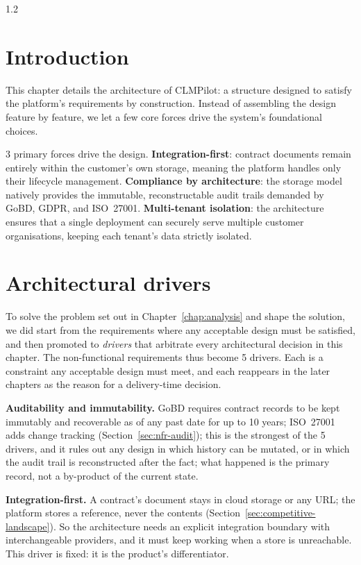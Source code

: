\begin{spacing}{1.2}

\section*{Introduction}
This chapter details the architecture of CLMPilot: a structure designed
to satisfy the platform's requirements by construction. Instead of assembling the design feature by feature, we let a few
core forces drive the system's foundational choices.

3 primary forces drive the design. \textbf{Integration-first}: contract
documents remain entirely within the customer’s own storage, meaning the platform 
handles only their lifecycle management.
\textbf{Compliance by architecture}: the storage model natively provides the immutable,
reconstructable audit trails demanded by GoBD, GDPR, and ISO~27001.
\textbf{Multi-tenant isolation}: the architecture ensures that a single deployment
can securely serve multiple customer organisations, keeping each tenant's data
strictly isolated.

\section{Architectural drivers}
\label{sec:arch-drivers}

To solve the problem set out in Chapter~\ref{chap:analysis} and shape the
solution, we did start from the requirements where
any acceptable design must be satisfied, and then promoted to \emph{drivers}
that arbitrate every architectural decision in this chapter. The
non-functional requirements thus become 5 drivers. Each is a
constraint any acceptable design must meet, and each reappears in the later
chapters as the reason for a delivery-time decision.

\textbf{Auditability and immutability.} GoBD requires contract records to be
kept immutably and recoverable as of any past date for up to 10 years;
ISO~27001 adds change tracking (Section~\ref{sec:nfr-audit}); this is the
strongest of the 5 drivers, and it rules out any design in which history can be mutated,
or in which the audit trail is reconstructed after the fact; what happened
is the primary record, not a by-product of the current state.

\textbf{Integration-first.} A contract's document stays in cloud storage or any URL; 
the platform stores a reference, never the contents
(Section~\ref{sec:competitive-landscape}). So the architecture needs an
explicit integration boundary with interchangeable providers, and it must
keep working when a store is unreachable. This driver is fixed: it is
the product's differentiator.


\end{spacing}
